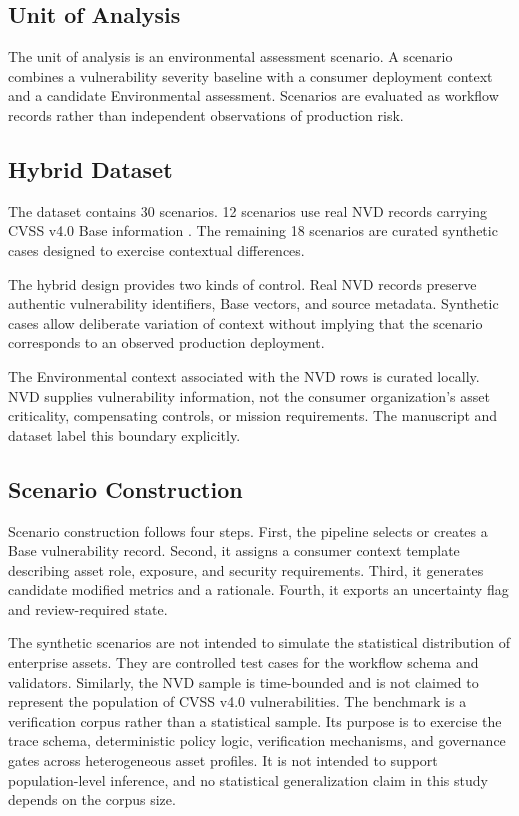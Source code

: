 \documentclass[conference]{IEEEtran}
\begin{document}
\subsection{Unit of Analysis}

The unit of analysis is an environmental assessment scenario. A scenario
combines a vulnerability severity baseline with a consumer deployment context
and a candidate Environmental assessment. Scenarios are evaluated as workflow
records rather than independent observations of production risk.

\subsection{Hybrid Dataset}

The dataset contains 30 scenarios. 12 scenarios use
real NVD records carrying CVSS v4.0 Base information
\cite{nvd_cve_2026_4251,nvd_cve_2026_4252,nvd_cve_2026_4270,nvd_cve_2026_28490,nvd_cve_2026_28498,nvd_cve_2026_29510,nvd_cve_2026_29513,nvd_cve_2026_29520,nvd_cve_2026_29521,nvd_cve_2026_3644,nvd_cve_2026_4224,nvd_cve_2026_4253}. The remaining 18 scenarios are curated
synthetic cases designed to exercise contextual differences.

The hybrid design provides two kinds of control. Real NVD records preserve
authentic vulnerability identifiers, Base vectors, and source metadata.
Synthetic cases allow deliberate variation of context without implying that
the scenario corresponds to an observed production deployment.

The Environmental context associated with the NVD rows is curated locally.
NVD supplies vulnerability information, not the consumer organization's asset
criticality, compensating controls, or mission requirements. The manuscript
and dataset label this boundary explicitly.

\subsection{Scenario Construction}

Scenario construction follows four steps. First, the pipeline selects or
creates a Base vulnerability record. Second, it assigns a consumer context
template describing asset role, exposure, and security requirements. Third, it
generates candidate modified metrics and a rationale. Fourth, it exports an
uncertainty flag and review-required state.

The synthetic scenarios are not intended to simulate the statistical
distribution of enterprise assets. They are controlled test cases for the
workflow schema and validators. Similarly, the NVD sample is time-bounded and
is not claimed to represent the population of CVSS v4.0 vulnerabilities.
The benchmark is a verification corpus rather than a statistical sample. Its purpose is to exercise the trace schema, deterministic policy logic, verification mechanisms, and governance gates across heterogeneous asset profiles. It is not intended to support population-level inference, and no statistical generalization claim in this study depends on the corpus size.
\end{document}
